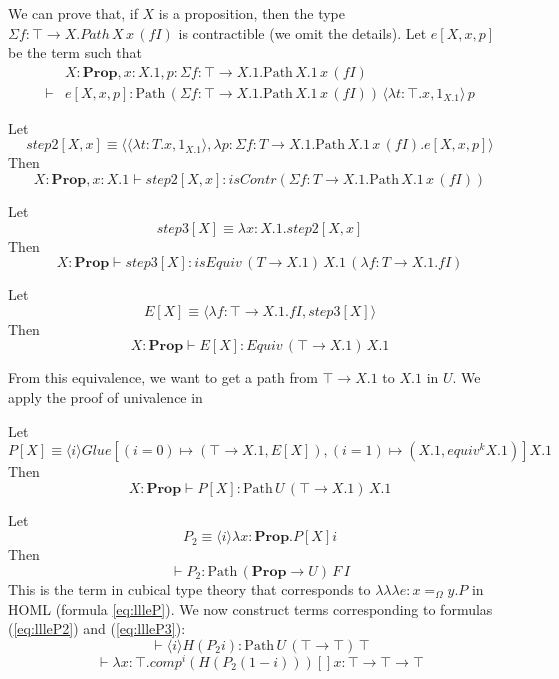 \documentclass[a4paper,UKenglish]{lipics-v2016}
\newcommand*{\triplelambda}{\ensuremath{\lambda \!\! \lambda \!\! \lambda}}
\newcommand{\Path}[3]{\ensuremath{\mathrm{Path} \, {#1} \, {#2} \, {#3}}}
\newcommand{\Prop}{\mathbf{Prop}}
\theoremstyle{plain}
\theoremstyle{definition}
\begin{document}
We can prove that, if $X$ is a proposition, then the type $\Sigma f:\top \rightarrow X. Path \, X \, x \, (f I)$ is contractible (we omit the details).  Let $e[X, x, p]$ be the term such that
\begin{align*} & X : \Prop, x : X.1, p : \Sigma f:\top \rightarrow X.1. \Path{X.1}{x}{(fI)} \\
\vdash & e[X, x, p] : \Path{(\Sigma f:\top \rightarrow X.1. \Path{X.1}{x}{(f I)})}{\langle \lambda t : \top . x, 1_{X.1} \rangle}{p}
\end{align*}

Let
\[ step2[X,x] \equiv \langle \langle \lambda t : T.x, 1_{X.1} \rangle,
\lambda p : \Sigma f : T \rightarrow X.1. \Path{X.1}{x}{(fI)}. e[X, x, p] \rangle \]
Then
\[ X : \Prop, x : X.1 \vdash step2[X, x] : isContr(\Sigma f:T \rightarrow X.1. \Path{X.1}{x}{(fI)}) \]

Let
\[ step3[X] \equiv \lambda x : X.1. step2[X, x] \]
Then
\[X : \Prop \vdash step3[X] : isEquiv \, (T \rightarrow X.1) \, X.1 \, (\lambda f : T \rightarrow X.1. f I) \]

Let
\[ E[X] \equiv \langle \lambda f : \top \rightarrow X.1. f I, step3[X] \rangle \]
Then
\[ X : \Prop \vdash E[X] : Equiv \, (\top \rightarrow X.1) \, X.1 \]

From this equivalence, we want to get a path from $\top \rightarrow X.1$ to $X.1$ in $U$.  We apply the proof of univalence in \cite{cchm:cubical}

Let
\[ P[X] \equiv \langle i \rangle Glue [(i = 0) \mapsto (\top \rightarrow X.1, E[X]), (i = 1) \mapsto (X.1, equiv^k X.1)] X.1 \]
Then
\[ X : \Prop \vdash P[X] : \Path{U}{(\top \rightarrow X.1)}{X.1} \]

Let
\[ P_2 \equiv \langle i \rangle \lambda x : \Prop. P[X] i \]
Then
\[ \vdash P_2 : \Path{(\Prop \rightarrow U)}{F}{I} \]
This is the term in cubical type theory that corresponds to $\triplelambda e : x =_\Omega y.P$ in HOML (formula \ref{eq:llleP}).  We now construct
terms corresponding to formulas (\ref{eq:llleP2}) and (\ref{eq:llleP3}):
\[ \vdash \langle i \rangle H (P_2 i) : \Path{U}{(\top \rightarrow \top)}{\top} \]
\[ \vdash \lambda x : \top. comp^i (H (P_2 (1 - i))) [] x : \top \rightarrow \top \rightarrow \top \]
\end{document}
